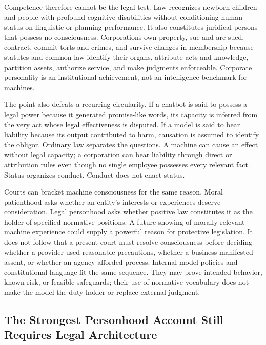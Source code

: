 Competence therefore cannot be the legal test. Law recognizes newborn children and people with profound cognitive disabilities without conditioning human status on linguistic or planning performance. It also constitutes juridical persons that possess no consciousness. Corporations own property, sue and are sued, contract, commit torts and crimes, and survive changes in membership because statutes and common law identify their organs, attribute acts and knowledge, partition assets, authorize service, and make judgments enforceable. Corporate personality is an institutional achievement, not an intelligence benchmark for machines.

The point also defeats a recurring circularity. If a chatbot is said to possess a legal power because it generated promise-like words, its capacity is inferred from the very act whose legal effectiveness is disputed. If a model is said to bear liability because its output contributed to harm, causation is assumed to identify the obligor. Ordinary law separates the questions. A machine can cause an effect without legal capacity; a corporation can bear liability through direct or attribution rules even though no single employee possesses every relevant fact. Status organizes conduct. Conduct does not enact status.

Courts can bracket machine consciousness for the same reason. Moral patienthood asks whether an entity's interests or experiences deserve consideration. Legal personhood asks whether positive law constitutes it as the holder of specified normative positions. A future showing of morally relevant machine experience could supply a powerful reason for protective legislation. It does not follow that a present court must resolve consciousness before deciding whether a provider used reasonable precautions, whether a business manifested assent, or whether an agency afforded process. Internal model policies and constitutional language fit the same sequence. They may prove intended behavior, known risk, or feasible safeguards; their use of normative vocabulary does not make the model the duty holder or replace external judgment.

\subsection{The Strongest Personhood Account Still Requires Legal Architecture}


